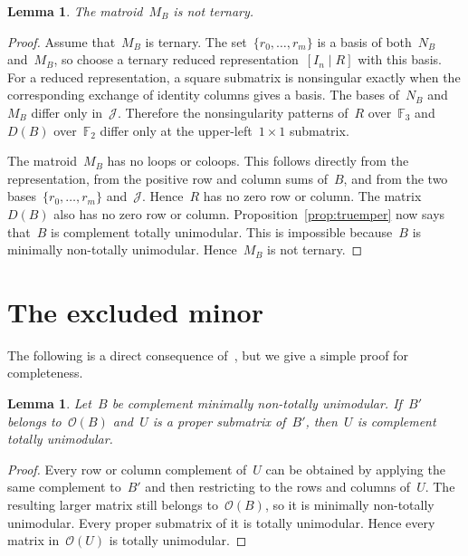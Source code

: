 \documentclass{amsart}
\newtheorem{lemma}[theorem]{Lemma}
\numberwithin{equation}{section}
\newcommand{\F}{\mathbb F}
\newcommand{\cO}{\mathcal O}
\newcommand{\cJ}{\mathcal J}
\begin{document}
\begin{lemma}\label{lem:not-ternary}
    The matroid~$M_B$ is not ternary.
\end{lemma}
\begin{proof}
    Assume that~$M_B$ is ternary.
    The set~$\{r_0,\ldots,r_m\}$ is a basis of both~$N_B$ and~$M_B$, so choose a ternary reduced representation~$[I_n\mid R]$ with this basis.
    For a reduced representation, a square submatrix is nonsingular exactly when the corresponding exchange of identity columns gives a basis.
    The bases of~$N_B$ and~$M_B$ differ only in~$\cJ$.
    Therefore the nonsingularity patterns of~$R$ over~$\F_3$ and~$D(B)$ over~$\F_2$ differ only at the upper-left~$1\times1$ submatrix.
    
    The matroid~$M_B$ has no loops or coloops.
    This follows directly from the representation, from the positive row and column sums of~$B$, and from the two bases~$\{r_0,\ldots,r_m\}$ and~$\cJ$.
    Hence~$R$ has no zero row or column.
    The matrix~$D(B)$ also has no zero row or column.
    Proposition~\ref{prop:truemper} now says that~$B$ is complement totally unimodular.
    This is impossible because~$B$ is minimally non-totally unimodular.
    Hence~$M_B$ is not ternary.
\end{proof}


\section{The excluded minor} \label{sec:minors}

The following is a direct consequence of~\cite[Corollary~3.35 and~3.33]{Chervet_Grappe_Vallee_2026}, but we give a simple proof for completeness.

\begin{lemma}\label{lem:proper-CTU}
    Let~$B$ be complement minimally non-totally unimodular.
    If~$B'$ belongs to~$\cO(B)$ and~$U$ is a proper submatrix of~$B'$, then~$U$ is complement totally unimodular.
\end{lemma}

\begin{proof}
    Every row or column complement of~$U$ can be obtained by applying the same complement to~$B'$ and then restricting to the rows and columns of~$U$.
    The resulting larger matrix still belongs to~$\cO(B)$, so it is minimally non-totally unimodular.
    Every proper submatrix of it is totally unimodular.
    Hence every matrix in~$\cO(U)$ is totally unimodular.
\end{proof}
\end{document}
